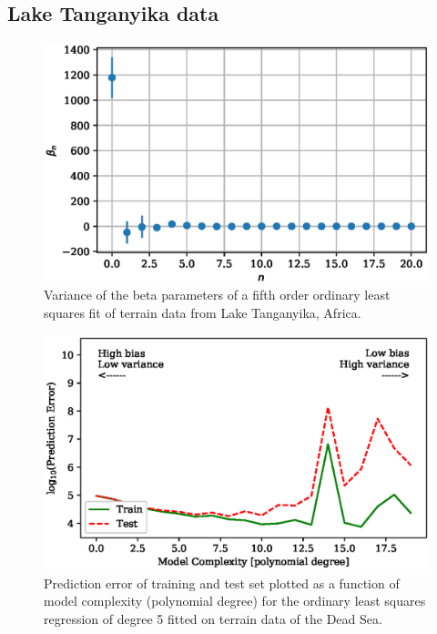 \documentclass[a4paper, 10pt]{article}
\begin{document}
\subsection{Lake Tanganyika data}

\begin{figure}[H]
    \includegraphics[scale=1]{figs/beta_variance_ols_terrain.eps}
    \caption{Variance of the beta parameters of a fifth order ordinary least squares fit of terrain data from Lake Tanganyika, Africa.}
    \label{fig:beta_variance_terrain}
\end{figure}


\begin{figure}[H]
    \includegraphics[scale=1]{figs/biasvariancetradeoff_ols_terrain.eps}
    \caption{Prediction error of training and test set plotted as a function of model complexity (polynomial degree) for the ordinary least squares regression of degree 5 fitted on terrain data of the Dead Sea.}
    \label{fig:bias_ols_terrain}
\end{figure}
\end{document}
